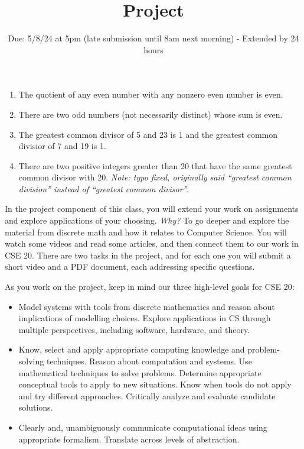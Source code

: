 \documentclass[12pt, oneside]{article}
\begin{document}
\begin{enumerate}[labelindent=0pt, leftmargin=0pt]
        \begin{enumerate}
            \item The quotient of any even number with any nonzero even number is even.
            \item There are two odd numbers (not necessarily distinct) whose sum is even.
            \item The greatest common divisor of 5 and 23 is 1 and the greatest common divisior of 7 and 19 is 1.
            \item There are two positive integers greater than 20 that have the same greatest common divisor with 20. {\it Note: typo fixed, 
            originally said ``greatest common division'' instead of ``greatest common divisor''.}
        \end{enumerate}
    \end{enumerate}

\newpage

\setlength{\parindent}{0em}
\setlength{\parskip}{0em}

\title{Project}
\date{Due: 5/8/24 at 5pm (late submission until 8am next morning) - Extended by 24 hours}


\maketitle
\thispagestyle{fancy}

\vspace{-20pt}

In the project component of this class, you will extend your 
work on assignments and explore applications of your choosing. 
{\it Why?}
To go deeper and explore the material from discrete math and how it relates to Computer Science.
You will watch some videos and read some articles, and then connect them to our work in CSE 20. There 
are two tasks in the project, and for each one you will submit a short video and a PDF document, each 
addressing specific questions.


As you work on the project, keep in mind our three high-level goals for CSE 20:
\begin{itemize}
\item Model systems with tools from discrete mathematics and reason about implications 
of modelling choices. Explore applications in CS through multiple perspectives, including software, hardware, and theory.
\item Know, select and apply appropriate computing knowledge and problem-solving techniques. Reason about computation and systems. Use mathematical techniques to solve problems. Determine appropriate conceptual tools to apply to new situations. Know when tools do not apply and try different approaches. Critically analyze and evaluate candidate solutions.
\item Clearly and, unambiguously communicate computational ideas using appropriate formalism. Translate across levels of abstraction.
\end{itemize}
\end{document}
